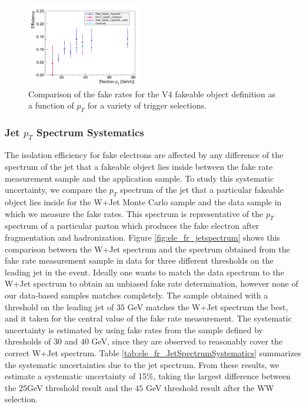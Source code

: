 \begin{figure}[!htbp]
\begin{center}
\includegraphics[width=0.45\textwidth]{figures/ElectronFakeRate_DenominatorV4_TriggerDependence.pdf}
\caption{Comparison of the fake rates for the V4 fakeable object definition as a function of $p_T$
for a variety of trigger selections.}
\label{fig:ele_fr_triggerDependence}
\end{center}
\end{figure}


\subsubsection{Jet $p_{T}$ Spectrum Systematics}
\label{sec:FakeElectronBkgJetSpectrumSystematics}

The isolation efficiency for fake electrons are affected by any difference of the spectrum of the
jet that a fakeable object lies inside between the fake rate measurement sample and the 
application sample. To study this systematic uncertainty, we compare the $p_{T}$ spectrum 
of the jet that a particular fakeable object lies inside for the W+Jet Monte Carlo sample and the
data sample in which we measure the fake rates. This spectrum is representative of the $p_{T}$
spectrum of a particular parton which produces the fake electron after fragmentation and 
hadronization. Figure \ref{fig:ele_fr_jetspectrum} shows this comparison between the W+Jet spectrum and the
spectrum obtained from the fake rate measurement sample in data for three different 
thresholds on the leading jet in the event. Ideally one wants to match the data spectrum to the
W+Jet spectrum to obtain an unbiased fake rate determination, however none of our data-based
samples matches completely. The sample obtained with a threshold on the leading jet of
$35$ GeV matches the W+Jet spectrum the best, and it taken for the central value of the 
fake rate measurement. The systematic uncertainty is estimated by using fake rates from the sample 
defined by thresholds of $30$ and $40$ GeV, since they are observed to reasonably cover the 
correct W+Jet spectrum. Table \ref{tab:ele_fr_JetSpectrumSystematics} summarizes the systematic
uncertainties due to the jet spectrum. From these results, we estimate a systematic uncertainty 
of 15$\%$, taking the largest difference between the $25$GeV threshold result and the $45$ GeV 
threshold result after the WW selection.


